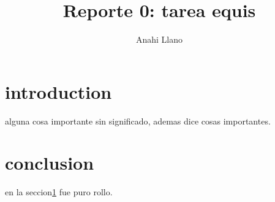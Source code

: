 \documentclass{article}
\title { Reporte 0: tarea equis}
\author{Anahi Llano}
\begin{document}
\maketitle

\section{introduction}\label{intro}

alguna cosa importante sin significado\citep{libro},
ademas\citet{art} dice cosas importantes.

\section{conclusion}

en la seccion\ref{intro} fue puro rollo.



\end{document}

